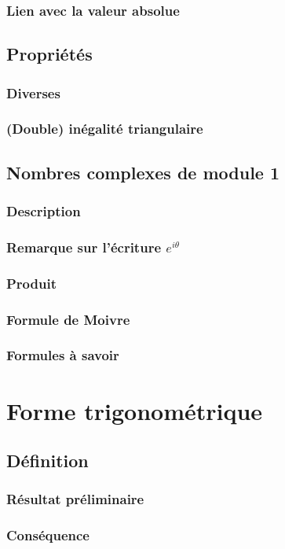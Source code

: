 \documentclass[12pt,a4paper,french]{book}
\begin{document}
			\subsubsection{Lien avec la valeur absolue}
		\subsection{Propriétés}
			\subsubsection{Diverses}
			\subsubsection{(Double) inégalité triangulaire}
		\subsection{Nombres complexes de module 1}
			\subsubsection{Description}
			\subsubsection{Remarque sur l'écriture $e^{i\theta}$}
			\subsubsection{Produit}
			\subsubsection{Formule de Moivre}
			\subsubsection{Formules à savoir}
	\section{Forme trigonométrique}
		\subsection{Définition}
			\subsubsection{Résultat préliminaire}
			\subsubsection{Conséquence}
\end{document}
